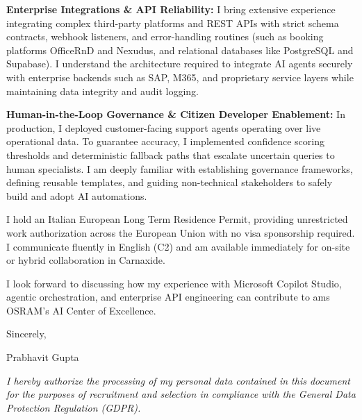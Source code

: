 \documentclass[10.5pt,a4paper]{article}
\begin{document}
\textbf{Enterprise Integrations \& API Reliability:} I bring extensive experience integrating complex third-party platforms and REST APIs with strict schema contracts, webhook listeners, and error-handling routines (such as booking platforms OfficeRnD and Nexudus, and relational databases like PostgreSQL and Supabase). I understand the architecture required to integrate AI agents securely with enterprise backends such as SAP, M365, and proprietary service layers while maintaining data integrity and audit logging.

\textbf{Human-in-the-Loop Governance \& Citizen Developer Enablement:} In production, I deployed customer-facing support agents operating over live operational data. To guarantee accuracy, I implemented confidence scoring thresholds and deterministic fallback paths that escalate uncertain queries to human specialists. I am deeply familiar with establishing governance frameworks, defining reusable templates, and guiding non-technical stakeholders to safely build and adopt AI automations.

I hold an Italian European Long Term Residence Permit, providing unrestricted work authorization across the European Union with no visa sponsorship required. I communicate fluently in English (C2) and am available immediately for on-site or hybrid collaboration in Carnaxide.

I look forward to discussing how my experience with Microsoft Copilot Studio, agentic orchestration, and enterprise API engineering can contribute to ams OSRAM's AI Center of Excellence.

Sincerely,

Prabhavit Gupta

\vspace{0.6em}
{\footnotesize \textit{I hereby authorize the processing of my personal data contained in this document for the purposes of recruitment and selection in compliance with the General Data Protection Regulation (GDPR).}\par}
\end{document}
